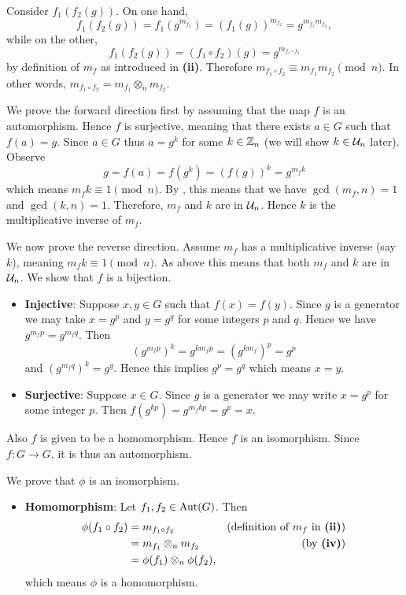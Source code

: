 \begin{questions}
\begin{partquestions}{\roman*}
        \item Consider $f_1(f_2(g))$. On one hand,
        \[
            f_1(f_2(g)) = f_1(g^{m_{f_2}}) = (f_1(g))^{m_{f_2}} = g^{m_{f_1}m_{f_2}},
        \]
        while on the other,
        \[
            f_1(f_2(g)) = (f_1 \circ f_2)(g) = g^{m_{f_1\circ f_2}}
        \]
        by definition of $m_f$ as introduced in \textbf{(ii)}. Therefore $m_{f_1\circ f_2} \equiv m_{f_1}m_{f_2} \pmod n$. In other words, $m_{f_1\circ f_2} = m_{f_1} \otimes_n m_{f_2}$.

        \item We prove the forward direction first by assuming that the map $f$ is an automorphism. Hence $f$ is surjective, meaning that there exists $a \in G$ such that $f(a) = g$. Since $a \in G$ thus $a = g^k$ for some $k \in \mathbb{Z}_n$ (we will show $k \in \mathcal{U}_{n}$ later). Observe
        \[
            g = f(a) = f(g^k) = (f(g))^k = g^{m_fk}
        \]
        which means $m_fk \equiv 1 \pmod n$. By , this means that we have $\gcd(m_f, n) = 1$ and $\gcd(k, n) = 1$. Therefore, $m_f$ and $k$ are in $\mathcal{U}_{n}$. Hence $k$ is the multiplicative inverse of $m_f$.

        We now prove the reverse direction. Assume $m_f$ has a multiplicative inverse (say $k$), meaning $m_fk \equiv 1 \pmod n$. As above this means that both $m_f$ and $k$ are in $\mathcal{U}_{n}$. We show that $f$ is a bijection.
        \begin{itemize}
            \item \textbf{Injective}: Suppose $x, y \in G$ such that $f(x) = f(y)$. Since $g$ is a generator we may take $x = g^p$ and $y = g^q$ for some integers $p$ and $q$. Hence we have $g^{m_fp} = g^{m_fq}$. Then
            \[
                \left(g^{m_fp}\right)^k = g^{km_fp} = \left(g^{km_f}\right)^p = g^p
            \]
            and $\left(g^{m_fq}\right)^k = g^q$. Hence this implies $g^p = g^q$ which means $x = y$.
            \item \textbf{Surjective}: Suppose $x \in G$. Since $g$ is a generator we may write $x = g^p$ for some integer $p$. Then $f(g^{kp}) = g^{m_fkp} = g^p = x$.
        \end{itemize}
        Also $f$ is given to be a homomorphism. Hence $f$ is an isomorphism. Since $f: G \to G$, it is thus an automorphism.

        \item We prove that $\phi$ is an isomorphism.
        \begin{itemize}
            \item \textbf{Homomorphism}: Let $f_1, f_2 \in \mathrm{Aut}(G)$. Then
            \begin{align*}
                \phi(f_1\circ f_2) &= m_{f_1\circ f_2} & (\text{definition of } m_f \text{ in }\textbf{(ii)})\\
                &= m_{f_1} \otimes_n m_{f_2} & (\text{by \textbf{(iv)}})\\
                &= \phi(f_1)\otimes_n\phi(f_2),
            \end{align*}
            which means $\phi$ is a homomorphism.


\end{itemize}
\end{partquestions}
\end{questions}
